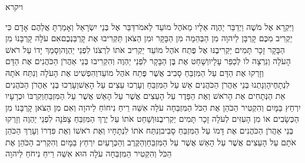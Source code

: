 \documentclass[../main/main.tex]{subfiles}
\begin{document}
\thispagestyle{empty}
\Incipit{}ויקרא
\cleardoublepage
\RTLmulticolcolumns
\begin{multicols*}{\ncols}
וַיִּקְרָא אֶל מֹשֶׁה וַיְדַבֵּר יַהְוֶה אֵלָיו מֵאֹהֶל מוֹעֵד לֵאמֹר\PreVerseSpace{}דַּבֵּר אֶל בְּנֵי יִשְׂרָאֵל וְאָמַרְתָּ אֲלֵהֶם אָדָם כִּי יַקְרִיב מִכֶּם קָרְבָּן לַיהוָה מִן הַבְּהֵמָה מִן הַבָּקָר וּמִן הַצֹּאן תַּקְרִיבוּ אֶת קָרְבַּנְכֶם\PreVerseSpace{}אִם עֹלָה קָרְבָּנוֹ מִן הַבָּקָר זָכָר תָּמִים יַקְרִיבֶנּוּ אֶל פֶּתַח אֹהֶל מוֹעֵד יַקְרִיב אֹתוֹ לִרְצֹנוֹ לִפְנֵי יַהְוֶה\PreVerseSpace{}וְסָמַךְ יָדוֹ עַל רֹאשׁ הָעֹלָה וְנִרְצָה לוֹ לְכַפֵּר עָלָיו\PreVerseSpace{}וְשָׁחַט אֶת בֶּן הַבָּקָר לִפְנֵי יַהְוֶה וְהִקְרִיבוּ בְּנֵי אַהֲרֹן הַכֹּהֲנִים אֶת הַדָּם וְזָרְקוּ אֶת הַדָּם עַל הַמִּזְבֵּחַ סָבִיב אֲשֶׁר פֶּתַח אֹהֶל מוֹעֵד\PreVerseSpace{}וְהִפְשִׁיט אֶת הָעֹלָה וְנִתַּח אֹתָהּ לִנְתָחֶיהָ\PreVerseSpace{}וְנָתְנוּ בְּנֵי אַהֲרֹן הַכֹּהֲנִים\SubEnd{} אֵשׁ עַל הַמִּזְבֵּחַ וְעָרְכוּ עֵצִים עַל הָאֵשׁ\PreVerseSpace{}וְעָרְכוּ בְּנֵי אַהֲרֹן הַכֹּהֲנִים אֵת הַנְּתָחִים אֶת הָרֹאשׁ וְאֶת הַפָּדֶר עַל הָעֵצִים אֲשֶׁר עַל הָאֵשׁ אֲשֶׁר עַל הַמִּזְבֵּחַ\PreVerseSpace{}וְקִרְבּוֹ וּכְרָעָיו יִרְחַץ בַּמָּיִם וְהִקְטִיר הַכֹּהֵן אֶת הַכֹּל הַמִּזְבֵּחָה עֹלָה אִשֵּׁה רֵיחַ נִיחוֹחַ לַיהוָה \ClosedSection{}וְאִם מִן הַצֹּאן קָרְבָּנוֹ מִן הַכְּשָׂבִים אוֹ מִן הָעִזִּים לְעֹלָה זָכָר תָּמִים יַקְרִיבֶנּוּ\PreVerseSpace{}וְשָׁחַט אֹתוֹ עַל יֶרֶךְ הַמִּזְבֵּחַ צָפֹנָה לִפְנֵי יַהְוֶה וְזָרְקוּ בְּנֵי אַהֲרֹן הַכֹּהֲנִים אֶת דָּמוֹ עַל הַמִּזְבֵּחַ סָבִיב\PreVerseSpace{}וְנִתַּח אֹתוֹ לִנְתָחָיו וְאֶת רֹאשׁוֹ וְאֶת פִּדְרוֹ וְעָרַךְ הַכֹּהֵן אֹתָם עַל הָעֵצִים אֲשֶׁר עַל הָאֵשׁ אֲשֶׁר עַל הַמִּזְבֵּחַ\PreVerseSpace{}וְהַקֶּרֶב וְהַכְּרָעַיִם יִרְחַץ בַּמָּיִם וְהִקְרִיב הַכֹּהֵן אֶת הַכֹּל וְהִקְטִיר הַמִּזְבֵּחָה עֹלָה הוּא אִשֵּׁה רֵיחַ נִיחֹחַ לַיהוָה\OpenSection{}\par

\end{multicols*}
\end{document}
